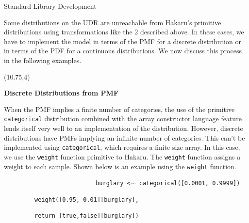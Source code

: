 \documentclass[22pt]{beamer}
\newenvironment{variableblock}[3]{%
  \setbeamercolor{block body}{#2}
  \setbeamercolor{block title}{#3}
  \begin{block}{#1}}{\end{block}}
\begin{document}
\begin{frame}[fragile]
\begin{textblock}{5}
\begin{textblock}{5}
\begin{block}{Standard Library Development}
\bigskip

Some distributions on the UDR are unreachable from Hakaru's primitive distributions using transformations like the 2 described above. In these cases, we have to implement the model in terms of the PMF for a discrete distribution or in terms of the PDF for a continuous distributions. We now discuss this process in the following examples. 

\end{block}

\end{textblock}

\end{textblock}


\begin{textblock}{5}(10.75,4)


\begin{variableblock}{}{}{}
\justifying

\small{\textbf{Discrete Distributions from PMF}}

\bigskip

\tiny{When the PMF implies a finite number of categories, the use of the primitive {\tt \tiny{categorical}} distribution combined with the array constructor language feature lends itself very well to an implementation of the distribution. However, discrete distributions have PMFs implying an infinite number of categories. This can’t be implemented using {\tt \tiny{categorical}}, which requires a finite size array. In this case, we use the {\tt \tiny{weight}} function primitive to Hakaru. The {\tt \tiny{weight}} function assigns a weight to each sample. Shown below is an example using the {\tt \tiny{weight}} function.
}

\begin{center}
\justifying
~~~~~~~~~~~~~~~~~~~~~~~~~~\tt{ \small{burglary {\color{green}<$\sim$} {\color{blue}categorical}([{\color{purple}0.0001}, {\color{purple}0.9999}])}}

~~~~~~~~~\tt{\small{{\color{blue}weight}([{\color{purple}0.95}, {\color{purple}0.01}][burglary],}}

~~~~~~~~~\tt{\small{{\color{red}return} [{\color{red}true},{\color{red}false}][burglary])}}
\end{center}

\bigskip


\end{variableblock}
\end{textblock}
\end{frame}
\end{document}
